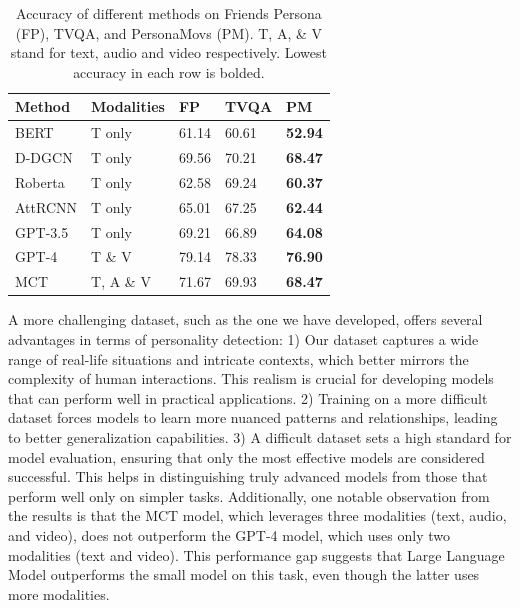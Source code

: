 \begin{table}[ht]
    \centering
    \small
    \begin{tabular}{lllll}
        \hline
        \textbf{Method} & \textbf{Modalities} & \textbf{FP} & \textbf{TVQA} & \textbf{PM} \\
        \hline
        BERT & T only& 61.14 & 60.61 & \textbf{52.94} \\
        \hline
        D-DGCN & T only & 69.56 & 70.21 & \textbf{68.47} \\
        \hline
        Roberta& T only &62.58 & 69.24 & \textbf{60.37} \\
        \hline
        AttRCNN & T only& 65.01 & 67.25 & \textbf{62.44}\\
        \hline
        GPT-3.5 & T only & 69.21 & 66.89 & \textbf{64.08}\\
        \hline
        GPT-4 & T \& V & 79.14 & 78.33 & \textbf{76.90}\\
        \hline
        MCT & T, A \& V & 71.67 & 69.93 & \textbf{68.47} \\
        \hline
    \end{tabular}
    \caption{Accuracy of different methods on Friends Persona (FP), TVQA, and PersonaMovs (PM). T, A, \& V stand for text, audio and video respectively. Lowest accuracy in each row is bolded.} 
\label{table:Method_Comparison}
\end{table}
A more challenging dataset, such as the one we have developed, offers several advantages in terms of personality detection: 1) Our dataset captures a wide range of real-life situations and intricate contexts, which better mirrors the complexity of human interactions. This realism is crucial for developing models that can perform well in practical applications. 2) Training on a more difficult dataset forces models to learn more nuanced patterns and relationships, leading to better generalization capabilities. 3) A difficult dataset sets a high standard for model evaluation, ensuring that only the most effective models are considered successful. This helps in distinguishing truly advanced models from those that perform well only on simpler tasks. Additionally, one notable observation from the results is that the MCT model, which leverages three modalities (text, audio, and video), does not outperform the GPT-4 model, which uses only two modalities (text and video). This performance gap suggests that Large Language Model outperforms the small model on this task, even though the latter uses more modalities.
